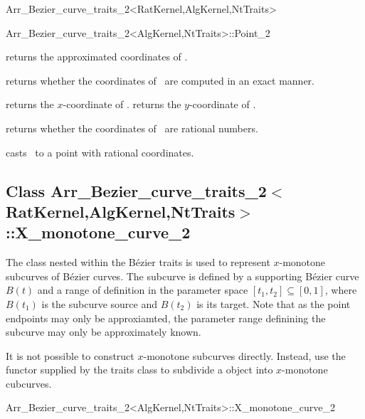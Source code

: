 \begin{ccRefClass}{Arr_Bezier_curve_traits_2<RatKernel,AlgKernel,NtTraits>}
\begin{ccClass}{Arr_Bezier_curve_traits_2<AlgKernel,NtTraits>::Point_2}
\ccAccessFunctions

  {returns the approximated coordinates of \ccVar.}

  {returns whether the coordinates of \ccVar\ are computed in an exact manner.}

  {returns the $x$-coordinate of \ccVar.
   }
\ccGlue
{}
  {returns the $y$-coordinate of \ccVar.
   }

  {returns whether the coordinates of \ccVar\ are rational numbers.}

  {casts \ccVar\ to a point with rational coordinates.
   }

\end{ccClass}


\subsection*{Class 
Arr\_Bezier\_curve\_traits\_2$<$RatKernel,AlgKernel,NtTraits$>$::X\_monotone\_curve\_2}

The  class nested within the B\'ezier traits is
used to represent $x$-monotone subcurves of B\'ezier curves. The subcurve is
defined by a supporting B\'ezier curve $B(t)$ and a range of definition in
the parameter space $[t_1, t_2] \subseteq [0, 1]$, where $B(t_1)$ is the
subcurve source and $B(t_2)$ is its target. Note that as the point endpoints
may only be approxiamted, the parameter range definining the subcurve may
only be approximately known.

It is not possible to construct $x$-monotone subcurves directly. Instead,
use the  functor supplied by the traits class to
subdivide a  object into $x$-monotone cubcurves.

\begin{ccClass}{Arr_Bezier_curve_traits_2<AlgKernel,NtTraits>::X_monotone_curve_2}

\ccAccessFunctions


\end{ccClass}
\end{ccRefClass}
